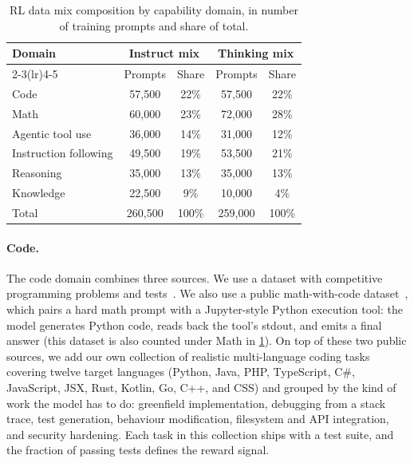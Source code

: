 \documentclass{llmxive}
\providecommand{\tableheadercolor}{}
\begin{document}
\begin{table}[!htbp]
  \centering
  \small
  \begin{tabular}{@{}lcccc@{}}
    \toprule
    \tableheadercolor
    \textbf{Domain} & \multicolumn{2}{c}{\textbf{Instruct mix}} & \multicolumn{2}{c}{\textbf{Thinking mix}} \\
    \cmidrule(lr){2-3}\cmidrule(lr){4-5}
                          & Prompts   & Share & Prompts   & Share \\
    \midrule
    Code                  & 57{,}500  & 22\% & 57{,}500  & 22\% \\
    Math                  & 60{,}000  & 23\% & 72{,}000  & 28\% \\
    Agentic tool use      & 36{,}000  & 14\% & 31{,}000  & 12\% \\
    Instruction following & 49{,}500  & 19\% & 53{,}500  & 21\% \\
    Reasoning             & 35{,}000  & 13\% & 35{,}000  & 13\% \\
    Knowledge             & 22{,}500  &  9\% & 10{,}000  &  4\% \\
    \midrule
    Total                 & 260{,}500 & 100\% & 259{,}000 & 100\% \\
    \bottomrule
  \end{tabular}
\caption{RL data mix composition by capability domain, in number of
  training prompts and share of total.}
\label{tab:rl-mix}
\end{table}

\paragraph{Code.}
The code domain combines three sources. We use a dataset with
competitive programming problems and tests~\cite{nemo-gym}.
We also use a public math-with-code dataset~\cite{nemo-gym}, which
pairs a hard math prompt with
a Jupyter-style Python execution tool: the model generates Python code, reads
back the tool's stdout, and emits a final answer (this dataset is also
counted under Math in \cref{tab:rl-mix}). On top of these two public
sources, we add our own collection of realistic multi-language coding
tasks covering twelve target languages (Python, Java, PHP,
TypeScript, C\#, JavaScript, JSX, Rust, Kotlin, Go, C++, and CSS) and
grouped by the kind of work the model has to do: greenfield
implementation, debugging from a stack trace, test generation,
behaviour modification, filesystem and API integration, and security
hardening. Each task in this collection ships with a test suite, and
the fraction of passing tests defines the reward signal.
\end{document}
